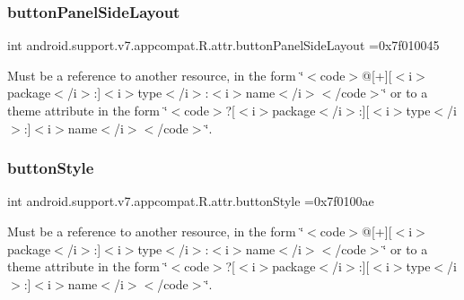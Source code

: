 \subsubsection{\texorpdfstring{button\+Panel\+Side\+Layout}{buttonPanelSideLayout}}
{\footnotesize\ttfamily int android.\+support.\+v7.\+appcompat.\+R.\+attr.\+button\+Panel\+Side\+Layout =0x7f010045\hspace{0.3cm}{\ttfamily [static]}}

Must be a reference to another resource, in the form \char`\"{}$<$code$>$@\mbox{[}+\mbox{]}\mbox{[}$<$i$>$package$<$/i$>$\+:\mbox{]}$<$i$>$type$<$/i$>$\+:$<$i$>$name$<$/i$>$$<$/code$>$\char`\"{} or to a theme attribute in the form \char`\"{}$<$code$>$?\mbox{[}$<$i$>$package$<$/i$>$\+:\mbox{]}\mbox{[}$<$i$>$type$<$/i$>$\+:\mbox{]}$<$i$>$name$<$/i$>$$<$/code$>$\char`\"{}. \mbox{\label{classandroid_1_1support_1_1v7_1_1appcompat_1_1R_1_1attr_a6706ae73b0588849f93a4121b5769ea4}} 
\subsubsection{\texorpdfstring{button\+Style}{buttonStyle}}
{\footnotesize\ttfamily int android.\+support.\+v7.\+appcompat.\+R.\+attr.\+button\+Style =0x7f0100ae\hspace{0.3cm}{\ttfamily [static]}}

Must be a reference to another resource, in the form \char`\"{}$<$code$>$@\mbox{[}+\mbox{]}\mbox{[}$<$i$>$package$<$/i$>$\+:\mbox{]}$<$i$>$type$<$/i$>$\+:$<$i$>$name$<$/i$>$$<$/code$>$\char`\"{} or to a theme attribute in the form \char`\"{}$<$code$>$?\mbox{[}$<$i$>$package$<$/i$>$\+:\mbox{]}\mbox{[}$<$i$>$type$<$/i$>$\+:\mbox{]}$<$i$>$name$<$/i$>$$<$/code$>$\char`\"{}. \mbox{\label{classandroid_1_1support_1_1v7_1_1appcompat_1_1R_1_1attr_ab141da798cf5a334c63def755033b611}} 
